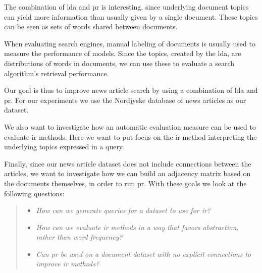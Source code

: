The combination of \gls{lda} and \gls{pr} is interesting, since underlying document topics can yield more information than usually given by a single document.
These topics can be seen as sets of words shared between documents. 

When evaluating search engines, manual labeling of documents is usually used to measure the performance of models\cite{yang2009topic}\cite{Tang2008}.
Since the topics, created by the \gls{lda}, are distributions of words in documents, we can use these to evaluate a search algorithm's retrieval performance. 

Our goal is thus to improve news article search by using a combination of \gls{lda} and \gls{pr}.
For our experiments we use the Nordjyske database of news articles as our dataset.

We also want to investigate how an automatic evaluation measure can be used to evaluate \gls{ir} methods.
Here we want to put focus on the \gls{ir} method interpreting the underlying topics expressed in a query.

Finally, since our news article dataset does not include connections between the articles, we want to investigate how we can build an adjacency matrix based on the documents themselves, in order to run \gls{pr}.
With these goals we look at the following questions:
\begin{quote}
	\begin{itemize}
		\item \emph{How can we generate queries for a dataset to use for \gls{ir}?}
		\item \emph{How can we evaluate \gls{ir} methods in a way that favors abstraction, rather than word frequency?}
	        \item \emph{Can \gls{pr} be used on a document dataset with no explicit connections to improve \gls{ir} methods?}
	\end{itemize}
\end{quote}




